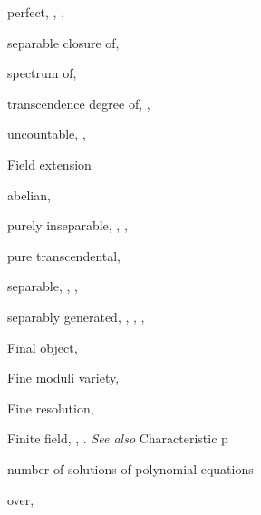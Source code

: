 {{\noindent\hspace*{7.5bp}perfect, , , \par
\noindent\hspace*{7.5bp}separable closure of, \par
\noindent\hspace*{7.5bp}spectrum of, \par
\noindent\hspace*{7.5bp}transcendence degree of, , \par
\noindent\hspace*{7.5bp}uncountable, , \par
\noindent\hspace*{0.0bp}Field extension\par
\noindent\hspace*{7.5bp}abelian, \par
\noindent\hspace*{7.5bp}purely inseparable, , , \par
\noindent\hspace*{7.5bp}pure transcendental, \par
\noindent\hspace*{7.5bp}separable, , , \par
\noindent\hspace*{7.5bp}separably generated, , , , \par
\noindent\hspace*{0.0bp}Final object, \par
\noindent\hspace*{0.0bp}Fine moduli variety, \par
\noindent\hspace*{0.0bp}Fine resolution, \par
\noindent\hspace*{0.0bp}Finite field, , . \emph{See also} Characteristic p\par
\noindent\hspace*{7.5bp}number of solutions of polynomial equations\par
\noindent\hspace*{15.0bp}over, \par
}}
